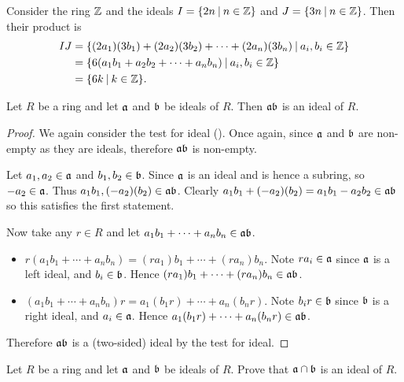 \begin{example}
    Consider the ring $\mathbb{Z}$ and the ideals $I = \{2n \vert n \in \Z\}$ and $J = \{3n \vert n \in \Z\}$. Then their product is
    \begin{align*}
        IJ &= \{(2a_1)(3b_1) + (2a_2)(3b_2) + \cdots + (2a_n)(3b_n) \vert a_i,b_i \in \Z\}\\
        &= \{6(a_1b_1 + a_2b_2 + \cdots + a_nb_n) \vert a_i,b_i \in \Z\}\\
        &= \{6k \vert k \in \Z\}.
    \end{align*}
\end{example}
\begin{proposition}
    Let $R$ be a ring and let $\mathfrak{a}$ and $\mathfrak{b}$ be ideals of $R$. Then $\mathfrak{ab}$ is an ideal of $R$.
\end{proposition}
\begin{proof}
    We again consider the test for ideal (). Once again, since $\mathfrak{a}$ and $\mathfrak{b}$ are non-empty as they are ideals, therefore $\mathfrak{ab}$ is non-empty.

    Let $a_1,a_2 \in \mathfrak{a}$ and $b_1,b_2 \in \mathfrak{b}$. Since $\mathfrak{a}$ is an ideal and is hence a subring, so $-a_2 \in \mathfrak{a}$. Thus $a_1b_1, (-a_2)(b_2) \in \mathfrak{ab}$. Clearly $a_1b_1 + (-a_2)(b_2) = a_1b_1 - a_2b_2 \in \mathfrak{ab}$ so this satisfies the first statement.

    Now take any $r \in R$ and let $a_1b_1 + \cdots + a_nb_n \in \mathfrak{ab}$.
    \begin{itemize}
        \item $r(a_1b_1 + \cdots + a_nb_n) = (ra_1)b_1 + \cdots + (ra_n)b_n$. Note $ra_i \in \mathfrak{a}$ since $\mathfrak{a}$ is a left ideal, and $b_i \in \mathfrak{b}$. Hence $(ra_1)b_1 + \cdots + (ra_n)b_n \in \mathfrak{ab}$.
        \item $(a_1b_1 + \cdots + a_nb_n)r = a_1(b_1r) + \cdots + a_n(b_nr)$. Note $b_ir \in \mathfrak{b}$ since $\mathfrak{b}$ is a right ideal, and $a_i \in \mathfrak{a}$. Hence $a_1(b_1r) + \cdots + a_n(b_nr) \in \mathfrak{ab}$.
    \end{itemize}

    Therefore $\mathfrak{ab}$ is a (two-sided) ideal by the test for ideal.
\end{proof}

\begin{exercise}
    Let $R$ be a ring and let $\mathfrak{a}$ and $\mathfrak{b}$ be ideals of $R$. Prove that $\mathfrak{a} \cap \mathfrak{b}$ is an ideal of $R$.
\end{exercise}

